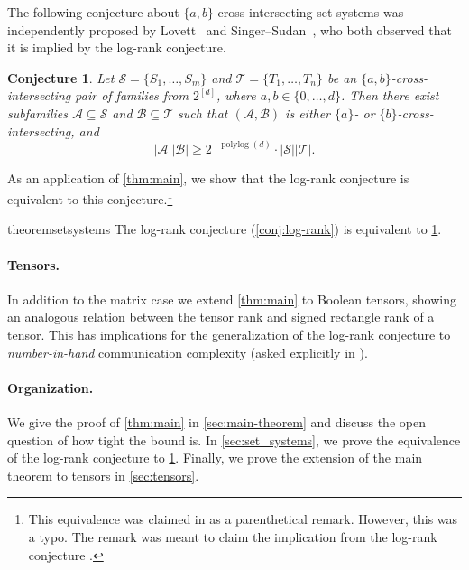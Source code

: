 \documentclass[11pt]{article}
\theoremstyle{plain}
\newtheorem{conjecture}[thm]{Conjecture}
\theoremstyle{remark}
\DeclareMathOperator{\polylog}{polylog}
\begin{document}
The following conjecture about $\{a,b\}$-cross-intersecting set systems was independently proposed by Lovett~\cite{lovett2021} and Singer–Sudan~\cite{singer2022}, who both observed that it is implied by the log-rank conjecture.
\begin{conjecture}\label{conj:set_systems}
	Let $\mathcal{S} = \{S_1, \ldots, S_m\}$ and $\mathcal{T} = \{T_1, \ldots, T_n\}$ be an $\{a,b\}$-cross-intersecting pair of families from $2^{[d]}$, where $a,b \in \{0, \ldots, d\}$. Then there exist subfamilies $\mathcal{A} \subseteq \mathcal{S}$ and $\mathcal{B} \subseteq \mathcal{T}$ such that $(\mathcal{A}, \mathcal{B})$ is either $\{a\}$- or $\{b\}$-cross-intersecting, and
	\[
	|\mathcal{A}||\mathcal{B}| \geq 2^{-\polylog(d)} \cdot |\mathcal{S}||\mathcal{T}|.
	\]
\end{conjecture}

As an application of \cref{thm:main}, we show that the log-rank conjecture is equivalent to this conjecture.\footnote{This equivalence was claimed in \cite{singer2022} as a parenthetical remark. However, this was a typo. The remark was meant to claim the implication from the log-rank conjecture \cite{madhu_personal_communication}.}

\begin{restatable}{theorem}{setsystems}\label{thm:set_systems}
	The log-rank conjecture (\cref{conj:log-rank}) is equivalent to \cref{conj:set_systems}.
\end{restatable}

\paragraph*{Tensors.} In addition to the matrix case we extend \cref{thm:main} to Boolean tensors, showing an analogous relation between the tensor rank and signed rectangle rank of a tensor. This has implications for the generalization of the log-rank conjecture to \emph{number-in-hand} communication complexity (asked explicitly in \cite{DKWPartition2011}).

\paragraph*{Organization.} We give the proof of \cref{thm:main} in \cref{sec:main-theorem} and discuss the open question of how tight the bound is.  In \cref{sec:set_systems}, we prove the equivalence of the log-rank conjecture to \cref{conj:set_systems}. Finally, we prove the extension of the main theorem to tensors in \cref{sec:tensors}.
\end{document}
